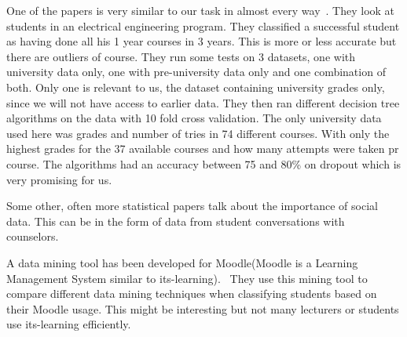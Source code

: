 \bigskip\noindent
One of the papers is very similar to our task in almost every way~\cite{7}.
They look at students in an electrical engineering program. 
They classified a successful student as having done all his 1 year courses in 3 years. 
This is more or less accurate but there are outliers of course. 
They run some tests on 3 datasets, one with university data only, one with pre-university data only and one combination of both. 
Only one is relevant to us, the dataset containing university grades only, since we will not have access to earlier data. 
They then ran different decision tree algorithms on the data with 10 fold cross validation. 
The only university data used here was grades and number of tries in 74 different courses. 
With only the highest grades for the 37 available courses and how many attempts were taken pr course.
The algorithms had an accuracy between 75 and 80\% on dropout which is very promising for us.

\bigskip\noindent
Some other, often more statistical papers talk about the importance of social data. 
This can be in the form of data from student conversations with counselors.~\cite{11} 

\bigskip\noindent
A data mining tool has been developed for Moodle(Moodle is a Learning Management System similar to its-learning).~\cite{12} 
They use this mining tool to compare different data mining techniques when classifying students based on their Moodle usage. 
This might be interesting but not many lecturers or students use its-learning efficiently. 